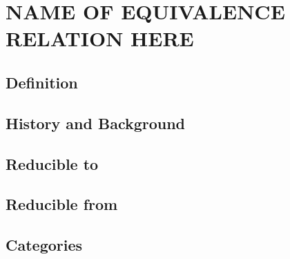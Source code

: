 \documentclass{article}
\begin{document}

\section{NAME OF EQUIVALENCE RELATION HERE}

\subsection{Definition}


\subsection{History and Background}


\subsection{Reducible to}

\subsection{Reducible from}

\subsection{Categories}
\end{document}
